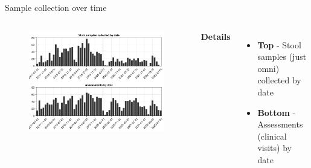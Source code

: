 \begin{frame}{Sample collection over time}
    \begin{columns}[c] %

    
        \begin{figure}
        \includegraphics[width=1\linewidth]{../figures/collection_over_time}
        \end{figure}

    
        \textbf{Details}
        \begin{itemize}
            \item \textbf{Top} - Stool samples (just omni) collected by date
            \item \textbf{Bottom} - Assessments (clinical visits) by date
        \end{itemize}

    \end{columns}

\end{frame}



